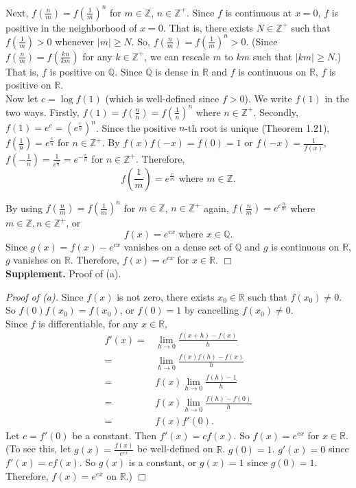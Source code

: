 \documentclass{article}
\begin{document}
Next, $f(\frac{n}{m}) = f(\frac{1}{m})^n$ for $m \in \mathbb{Z}$, $n \in \mathbb{Z}^{+}$.
Since $f$ is continuous at $x = 0$, $f$ is positive in the neighborhood of $x = 0$.
That is, there exists $N \in \mathbb{Z}^{+}$ such that $f(\frac{1}{m}) > 0$
whenever $|m| \geq N$.
So, $f(\frac{n}{m}) = f(\frac{1}{m})^n > 0$.
(Since $f(\frac{n}{m}) = f(\frac{kn}{km})$ for any $k \in \mathbb{Z}^{+}$,
we can rescale $m$ to $km$ such that $|km| \geq N$.)
That is, $f$ is positive on $\mathbb{Q}$.
Since $\mathbb{Q}$ is dense in $\mathbb{R}$ and $f$ is continuous on $\mathbb{R}$,
$f$ is positive on $\mathbb{R}$. \\

Now let $c = \log f(1)$ (which is well-defined since $f > 0$).
We write $f(1)$ in the two ways.
Firstly, $f(1) = f(\frac{n}{n}) = f(\frac{1}{n})^n$ where $n \in \mathbb{Z}^{+}$.
Secondly, $f(1) = e^c = (e^{\frac{c}{n}})^n$.
Since the positive $n$-th root is unique (Theorem 1.21),
$f(\frac{1}{n}) = e^{\frac{c}{n}}$ for $n \in \mathbb{Z}^{+}$.
By $f(x)f(-x) = f(0) = 1$ or $f(-x) = \frac{1}{f(x)}$,
$f(-\frac{1}{n}) = \frac{1}{e^{\frac{c}{n}}} = e^{-\frac{c}{n}}$ for $n \in \mathbb{Z}^{+}$.
Therefore,
$$f\left( \frac{1}{m} \right) = e^{\frac{c}{m}} \text{ where } m \in \mathbb{Z}.$$

By using
$f(\frac{n}{m}) = f(\frac{1}{m})^n$ for $m \in \mathbb{Z}$, $n \in \mathbb{Z}^{+}$ again,
$f(\frac{n}{m}) = e^{c \frac{n}{m}}$ where $m \in \mathbb{Z}, n \in \mathbb{Z}^{+}$, or
$$f(x) = e^{cx} \text{ where } x \in \mathbb{Q}.$$
Since $g(x) = f(x) - e^{cx}$ vanishes on a dense set of $\mathbb{Q}$
and $g$ is continuous on $\mathbb{R}$, $g$ vanishes on $\mathbb{R}$.
Therefore, $f(x) = e^{cx}$ for $x \in \mathbb{R}$.
$\Box$ \\



\textbf{Supplement.} Proof of (a).

\emph{Proof of (a).}
Since $f(x)$ is not zero, there exists $x_0 \in \mathbb{R}$ such that $f(x_0) \neq 0$.
So $f(0)f(x_0) = f(x_0)$, or $f(0) = 1$ by cancelling $f(x_0) \neq 0$. \\

Since $f$ is differentiable, for any $x \in \mathbb{R}$,
\begin{align*}
f'(x)
=& \lim_{h \rightarrow 0} \frac{f(x + h) - f(x)}{h} \\
=& \lim_{h \rightarrow 0} \frac{f(x)f(h) - f(x)}{h} \\
=& f(x) \lim_{h \rightarrow 0} \frac{f(h) - 1}{h} \\
=& f(x) \lim_{h \rightarrow 0} \frac{f(h) - f(0)}{h} \\
=& f(x) f'(0).
\end{align*}
Let $c = f'(0)$ be a constant. Then $f'(x) = c f(x)$. So $f(x) = e^{cx}$ for $x \in \mathbb{R}$.
(To see this, let $g(x) = \frac{f(x)}{e^{cx}}$ be well-defined on $\mathbb{R}$. $g(0) = 1$.
$g'(x) = 0$ since $f'(x) = c f(x)$. So $g(x)$ is a constant, or $g(x) = 1$ since $g(0) = 1$.
Therefore, $f(x) = e^{cx}$ on $\mathbb{R}$.)
$\Box$ \\
\end{document}

